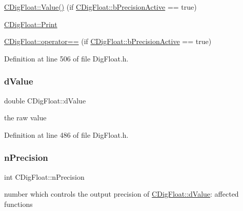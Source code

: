 \begin{DoxyItemize}
\item \hyperlink{classCDigFloat_af74b8cd0935294b6371f551b7a1ff640}{C\+Dig\+Float\+::\+Value()} (if \hyperlink{classCDigFloat_aa1f6ed0312a2aa6ae5ee2abd195adefc}{C\+Dig\+Float\+::b\+Precision\+Active} == true)
\item \hyperlink{classCDigFloat_a80731e0970f607114d6d1bde4d02bd39}{C\+Dig\+Float\+::\+Print}
\item \hyperlink{classCDigFloat_ad8980d984bf2bab71d15b830fd0180a5}{C\+Dig\+Float\+::operator==} (if \hyperlink{classCDigFloat_aa1f6ed0312a2aa6ae5ee2abd195adefc}{C\+Dig\+Float\+::b\+Precision\+Active} == true) 
\end{DoxyItemize}

Definition at line 506 of file Dig\+Float.\+h.

\mbox{\label{classCDigFloat_a4bbe69e30dd4e20527362493aa9aaf96}} 
\subsubsection{\texorpdfstring{d\+Value}{dValue}}
{\footnotesize\ttfamily double C\+Dig\+Float\+::d\+Value\hspace{0.3cm}{\ttfamily [protected]}}



the raw value 



Definition at line 486 of file Dig\+Float.\+h.

\mbox{\label{classCDigFloat_ad580654be35246d14c91482581c0bc11}} 
\subsubsection{\texorpdfstring{n\+Precision}{nPrecision}}
{\footnotesize\ttfamily int C\+Dig\+Float\+::n\+Precision\hspace{0.3cm}{\ttfamily [protected]}}



number which controls the output precision of \hyperlink{classCDigFloat_a4bbe69e30dd4e20527362493aa9aaf96}{C\+Dig\+Float\+::d\+Value}\+: affected functions 


